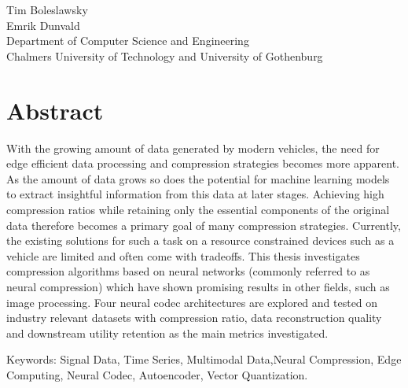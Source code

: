 \oneLineTitle\\
\oneLineSubtitle\\
Tim Boleslawsky\\
Emrik Dunvald\\
Department of Computer Science and Engineering\\
Chalmers University of Technology and University of Gothenburg

\thispagestyle{plain}			%
\section*{Abstract}
With the growing amount of data generated by modern vehicles, the need for edge efficient data processing and compression strategies becomes more apparent. As the amount of data grows so does the potential for machine learning models to extract insightful information from this data at later stages. Achieving high compression ratios while retaining only the essential components of the original data therefore becomes a primary goal of many compression strategies. Currently, the existing solutions for such a task on a resource constrained devices such as a vehicle are limited and often come with tradeoffs. This thesis investigates compression algorithms based on neural networks (commonly referred to as neural compression) which have shown promising results in other fields, such as image processing. Four neural codec architectures are explored and tested on industry relevant datasets with compression ratio, data reconstruction quality and downstream utility retention as the main metrics investigated.

\vfill
Keywords: Signal Data, Time Series, Multimodal Data,Neural Compression, Edge Computing, Neural Codec, Autoencoder, Vector Quantization.

\newpage				%
\thispagestyle{empty}
\mbox{}